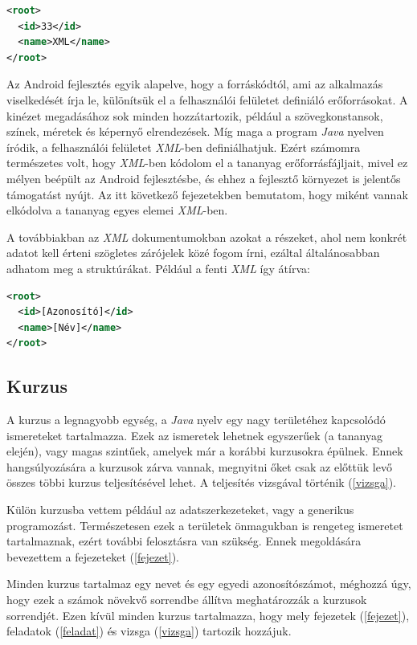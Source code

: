 \documentclass[12pt,a4paper]{article}
\newcommand{\xml}{\textit{XML}\xspace}
\begin{document}
	\bigskip
	\begin{lstlisting}[language=XML]
<root>
  <id>33</id>
  <name>XML</name>
</root>
	\end{lstlisting}
	\bigskip
	
	Az Android fejlesztés egyik alapelve, hogy a forráskódtól, ami az alkalmazás viselkedését írja le, különítsük el a felhasználói felületet definiáló erőforrásokat. A kinézet megadásához sok minden hozzátartozik, például a szövegkonstansok, színek, méretek és képernyő elrendezések. Míg maga a program \textit{Java} nyelven íródik, a felhasználói felületet \xml-ben definiálhatjuk. Ezért számomra természetes volt, hogy \xml-ben kódolom el a tananyag erőforrásfájljait, mivel ez mélyen beépült az Android fejlesztésbe, és ehhez a fejlesztő környezet is jelentős támogatást nyújt. Az itt következő fejezetekben bemutatom, hogy miként vannak elkódolva a tananyag egyes elemei \xml-ben.
	
	A továbbiakban az \xml dokumentumokban azokat a részeket, ahol nem konkrét adatot kell érteni szögletes zárójelek közé fogom írni, ezáltal általánosabban adhatom meg a struktúrákat. Például a fenti \xml így átírva:
	
	\bigskip
	\begin{lstlisting}[language=XML]
<root>
  <id>[Azonosító]</id>
  <name>[Név]</name>
</root>
	\end{lstlisting}
	
	\subsection{Kurzus}
	\bigskip
	
	A kurzus a legnagyobb egység, a \textit{Java} nyelv egy nagy területéhez kapcsolódó ismereteket tartalmazza. Ezek az ismeretek lehetnek egyszerűek (a tananyag elején), vagy magas szintűek, amelyek már a korábbi kurzusokra épülnek. Ennek hangsúlyozására a kurzusok zárva vannak, megnyitni őket csak az előttük levő összes többi kurzus teljesítésével lehet. A teljesítés vizsgával történik (\ref{vizsga}).
	
	Külön kurzusba vettem például az adatszerkezeteket, vagy a generikus programozást. Természetesen ezek a területek önmagukban is rengeteg ismeretet tartalmaznak, ezért további felosztásra van szükség. Ennek megoldására bevezettem a fejezeteket (\ref{fejezet}).
	
	Minden kurzus tartalmaz egy nevet és egy egyedi azonosítószámot, méghozzá úgy, hogy ezek a számok növekvő sorrendbe állítva meghatározzák a kurzusok sorrendjét.
	Ezen kívül minden kurzus tartalmazza, hogy mely fejezetek (\ref{fejezet}), feladatok (\ref{feladat}) és vizsga (\ref{vizsga}) tartozik hozzájuk.
	
\end{document}
